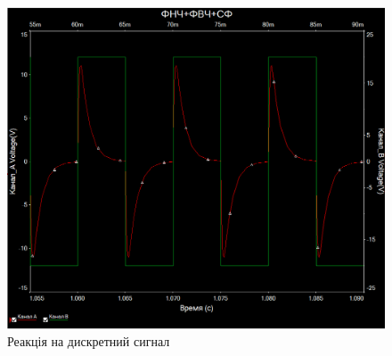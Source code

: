 \documentclass[
  ukrainian,
  14pt
]{extreport}
\begin{document}
\begin{figure}[H]
  \centering
  \includegraphics[width=.6\textwidth]{imgs/SF-4.png}
  \caption{Реакція на дискретний сигнал}
\end{figure}
\end{document}
